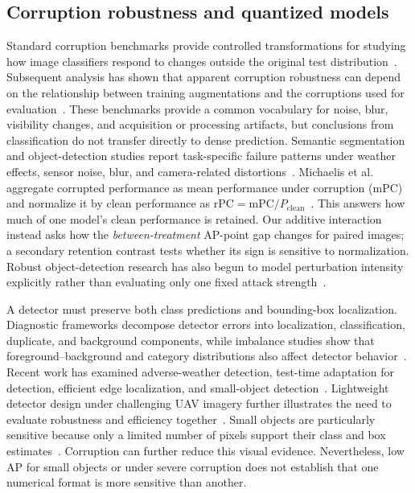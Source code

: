 \documentclass[a4paper,fleqn]{cas-dc}
\begin{document}
\subsection{Corruption robustness and quantized models}

Standard corruption benchmarks provide controlled transformations for studying how image classifiers respond to changes outside the original test distribution~\citep{hendrycks2019corruptions}. Subsequent analysis has shown that apparent corruption robustness can depend on the relationship between training augmentations and the corruptions used for evaluation~\citep{mintun2021augmentations}. These benchmarks provide a common vocabulary for noise, blur, visibility changes, and acquisition or processing artifacts, but conclusions from classification do not transfer directly to dense prediction. Semantic segmentation and object-detection studies report task-specific failure patterns under weather effects, sensor noise, blur, and camera-related distortions~\citep{kamann2020segrobustness,michaelis2019detectorrobustness,liu2024realworldcorruptions}. Michaelis et al. aggregate corrupted performance as mean performance under corruption (mPC) and normalize it by clean performance as $\mathrm{rPC}=\mathrm{mPC}/P_{\mathrm{clean}}$~\citep{michaelis2019detectorrobustness}. This answers how much of one model's clean performance is retained. Our additive interaction instead asks how the \emph{between-treatment} AP-point gap changes for paired images; a secondary retention contrast tests whether its sign is sensitive to normalization. Robust object-detection research has also begun to model perturbation intensity explicitly rather than evaluating only one fixed attack strength~\citep{cheng2025adversarial}.

A detector must preserve both class predictions and bounding-box localization. Diagnostic frameworks decompose detector errors into localization, classification, duplicate, and background components, while imbalance studies show that foreground--background and category distributions also affect detector behavior~\citep{hoiem2012diagnosing,bolya2020tide,oksuz2021imbalance}. Recent work has examined adverse-weather detection, test-time adaptation for detection, efficient edge localization, and small-object detection~\citep{luo2024lalm,zhang2025ddt,su2024yolic,zheng2024smallobjectreview}. Lightweight detector design under challenging UAV imagery further illustrates the need to evaluate robustness and efficiency together~\citep{liu2026lightweight}. Small objects are particularly sensitive because only a limited number of pixels support their class and box estimates~\citep{cheng2023small}. Corruption can further reduce this visual evidence. Nevertheless, low AP for small objects or under severe corruption does not establish that one numerical format is more sensitive than another.
\end{document}

